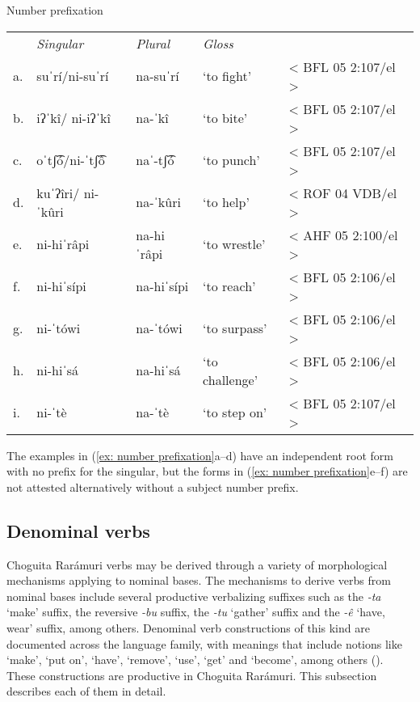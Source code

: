\ea\label{ex: number prefixation}
{Number prefixation}

\begin{tabular}{lllll}
     & \textit{Singular} & \textit{Plural} & \textit{Gloss}&\\
     a. & {suˈrí/ni-suˈrí} & {na-suˈrí} &{‘to fight’} & {< BFL 05 2:107/el >}\\
    b. & {iʔˈkî/ ni-iʔˈkî} & {na-ˈkî} & {‘to bite’} &    {< BFL 05 2:107/el >}\\
    c. & {oˈtʃ͡ó/ni-ˈtʃ͡ô}& {naˈ-tʃ͡ó} & {`to punch'} & {< BFL 05 2:107/el >}\\
    d. & {kuˈʔîri/ ni-ˈkûri}&{na-ˈkûri} & {‘to help’}& {< ROF 04 VDB/el >}\\
    e. & {ni-hiˈrâpi} & {na-hiˈrâpi} & {‘to wrestle’}  & {< AHF 05 2:100/el >}\\
    f. & {ni-hiˈsípi} & {na-hiˈsípi} & {‘to reach’} & {< BFL 05 2:106/el >}\\
    g. & {ni-ˈtówi}&{na-ˈtówi}&{‘to surpass’}& < BFL 05 2:106/el >\\
    h. & {ni-hiˈsá}&{na-hiˈsá}&{‘to challenge’} & < BFL 05 2:106/el >\\
    i. & {ni-ˈtè} & {na-ˈtè} & {‘to step on’} & < BFL 05 2:107/el >\\
\end{tabular}
\z

The examples in (\ref{ex: number prefixation}a--d) have an independent root form with no prefix for the singular, but the forms in (\ref{ex: number prefixation}e--f) are not attested alternatively without a subject number prefix.

\subsection{Denominal verbs}
\label{subsec: denominal verbs}

Choguita Rarámuri verbs may be derived through a variety of morphological mechanisms applying to nominal bases. The mechanisms to derive verbs from nominal bases include several productive verbalizing suffixes such as the \textit{-ta} `make' suffix, the reversive \textit{-bu} suffix, the \textit{-tu} ‘gather’ suffix and the \textit{-ê} `have, wear' suffix, among others. Denominal verb constructions of this kind are documented across the  language family, with meanings that include notions like `make', `put on', `have', `remove', `use', `get' and `become', among others (\citealt{haugen2008denominal, haugen2017derived}). These constructions are productive in Choguita Rarámuri. This subsection describes each of them in detail.

